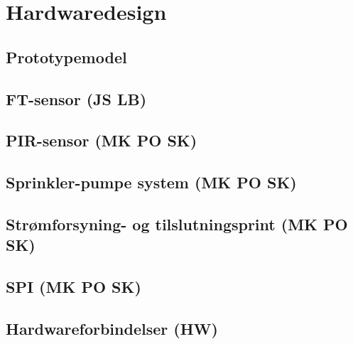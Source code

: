\chapter{Hardwaredesign}

\section{Prototypemodel}


\section{FT-sensor (JS LB)}


\section{PIR-sensor (MK PO SK)}


\section{Sprinkler-pumpe system (MK PO SK)}


\section{Strømforsyning- og tilslutningsprint (MK PO SK)}


\section{SPI (MK PO SK)}


\section{Hardwareforbindelser (HW)}
